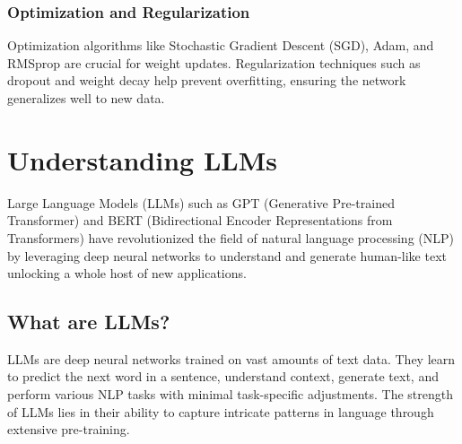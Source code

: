     \subsubsection{Optimization and Regularization}
    Optimization algorithms like Stochastic Gradient Descent (SGD), Adam, and RMSprop are crucial for weight updates. Regularization techniques such as dropout and weight decay help prevent overfitting, ensuring the network generalizes well to new data.
    


\section{Understanding LLMs}
    Large Language Models (LLMs) such as GPT (Generative Pre-trained Transformer) and BERT (Bidirectional Encoder Representations from Transformers) have revolutionized the field of natural language processing (NLP) by leveraging deep neural networks to understand and generate human-like text unlocking a whole host of new applications.


    \subsection{What are LLMs?}
        LLMs are deep neural networks trained on vast amounts of text data. They learn to predict the next word in a sentence, understand context, generate text, and perform various NLP tasks with minimal task-specific adjustments. The strength of LLMs lies in their ability to capture intricate patterns in language through extensive pre-training.
       
       
